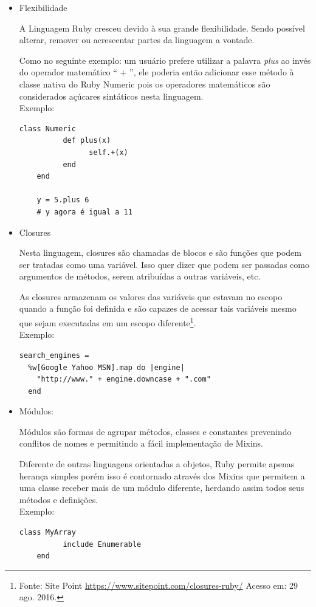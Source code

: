 \begin{itemize}
\item{Flexibilidade}
    \par A Linguagem Ruby cresceu devido à sua grande flexibilidade. Sendo possível alterar, remover ou acrescentar partes da linguagem a vontade.
    \par Como no seguinte exemplo: um usuário prefere utilizar a palavra \emph{plus} ao invés do operador matemático `` + '', ele poderia então adicionar esse método à classe nativa do Ruby Numeric pois os operadores matemáticos são considerados açúcares sintáticos nesta linguagem.
\\Exemplo:
\begin{lstlisting}[frame=single]
class Numeric
          def plus(x)
                self.+(x)
          end
    end

    y = 5.plus 6
    # y agora é igual a 11
\end{lstlisting}
\item{Closures}
\par Nesta linguagem, closures são chamadas de blocos e são funções que podem ser tratadas como uma variável. Isso quer dizer que podem ser passadas como argumentos de métodos, serem atribuídas a outras variáveis, etc.
\par As closures armazenam os valores das variáveis que estavam no escopo quando a função foi definida e são capazes de acessar tais variáveis mesmo que sejam executadas em um escopo diferente\footnote{Fonte: Site Point \url{https://www.sitepoint.com/closures-ruby/} Acesso em: 29 ago. 2016.}.
\\
Exemplo:
\begin{lstlisting}[frame=single]
search_engines =
  %w[Google Yahoo MSN].map do |engine|
    "http://www." + engine.downcase + ".com"
  end
\end{lstlisting}
\item{Módulos:}
\par Módulos são formas de agrupar métodos, classes e constantes prevenindo conflitos de nomes e permitindo a fácil implementação de Mixins.
\par Diferente de outras linguagens orientadas a objetos, Ruby permite apenas herança simples porém isso é contornado através dos Mixins que permitem a uma classe receber mais de um módulo diferente, herdando assim todos seus métodos e definições.
\\Exemplo:
\begin{lstlisting}[frame=single]
class MyArray
          include Enumerable
    end
\end{lstlisting}

\end{itemize}
